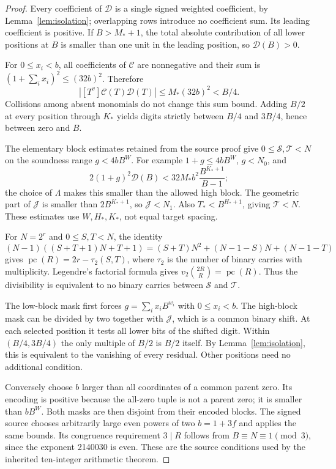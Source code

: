 \documentclass[11pt]{article}
\newcommand{\pc}{\operatorname{pc}}
\theoremstyle{definition}\newtheorem{definition}[theorem]{Definition}
\theoremstyle{remark}\newtheorem{remark}[theorem]{Remark}
\begin{document}
\begin{proof}
Every coefficient of $\mathcal D$ is a single signed weighted coefficient,
by Lemma~\ref{lem:isolation}; overlapping rows introduce no coefficient
sum. Its leading coefficient is positive. If $B>M_*+1$, the total
absolute contribution of all lower positions at $B$ is smaller than one
unit in the leading position, so $\mathcal D(B)>0$.

For $0\le x_i<b$, all coefficients of $\mathcal C$ are nonnegative and
their sum is $(1+\sum_i x_i)^2\le(32b)^2$. Therefore
\[
 \left|[T^v]\mathcal C(T)\mathcal D(T)\right|
 \le M_*(32b)^2<B/4.
\]
Collisions among absent monomials do not change this sum bound. Adding
$B/2$ at every position through $K_*$ yields digits strictly between
$B/4$ and $3B/4$, hence between zero and $B$.

The elementary block estimates retained from the source proof give
$0\le\mathcal S,\mathcal T<N$ on the soundness range $g<4bB^W$.
For example $1+g\le4bB^W$, $g<N_0$, and
\[
 2(1+g)^2\mathcal D(B)
 <32M_*b^2\frac{B^{K_*+1}}{B-1};
\]
the choice of $\Lambda$ makes this smaller than the allowed high block.
The geometric part of $\mathcal J$ is smaller than $2B^{K_*+1}$,
so $\mathcal J<N_1$. Also $T_*<B^{H_*+1}$, giving $\mathcal T<N$.
These estimates use $W,H_*,K_*$, not equal target spacing.

For $N=2^r$ and $0\le S,T<N$, the identity
\[
 (N-1)((S+T+1)N+T+1)
 =(S+T)N^2+(N-1-S)N+(N-1-T)
\]
gives
$\pc(R)=2r-\tau_2(S,T)$, where $\tau_2$ is the number of binary carries
with multiplicity. Legendre's factorial formula gives
$v_2\binom{2R}{R}=\pc(R)$. Thus the divisibility is equivalent to no
binary carries between $\mathcal S$ and $\mathcal T$.

The low-block mask first forces
$g=\sum_i x_iB^{w_i}$ with $0\le x_i<b$. The high-block mask can be
divided by two together with $\mathcal J$, which is a common binary
shift. At each selected position it tests all lower bits of the shifted
digit. Within $(B/4,3B/4)$ the only multiple of $B/2$ is $B/2$ itself.
By Lemma~\ref{lem:isolation}, this is equivalent to the vanishing of
every residual. Other positions need no additional condition.

Conversely choose $b$ larger than all coordinates of a common parent
zero. Its encoding is positive because the all-zero tuple is not a parent
zero; it is smaller than $bB^W$. Both masks are then disjoint from their
encoded blocks. The signed source chooses arbitrarily large even powers
of two $b=1+3f$ and applies the same bounds. Its congruence requirement
$3\mid R$ follows from $B\equiv N\equiv1\pmod3$, since the exponent
2140030 is even. These are the source conditions used by the inherited
ten-integer arithmetic theorem.
\end{proof}
\end{document}
